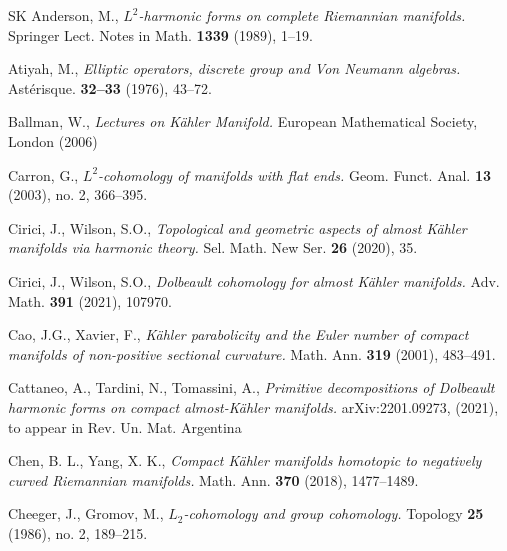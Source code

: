 \documentclass[12pt, twoside]{article}
\theoremstyle{definition}
\numberwithin{equation}{section}
\begin{document}
	\bigskip
	\footnotesize
	\begin{thebibliography}{SK}
		Anderson, M.,
		\textit{$L^{2}$-harmonic forms on complete Riemannian manifolds.}
		Springer Lect. Notes in Math. \textbf{1339} (1989), 1--19.
		
		Atiyah, M.,
		\textit{Elliptic operators, discrete group and Von Neumann algebras.}
		Ast\'{e}risque. \textbf{32--33} (1976), 43--72. 
		
		Ballman, W.,
		\textit{Lectures on K\"{a}hler Manifold.}
		European Mathematical Society, London (2006)
		
		
		
		
		Carron, G.,
		\textit{$L^{2}$-cohomology of manifolds with flat ends.}
		Geom. Funct. Anal. \textbf{13} (2003), no. 2, 366--395.
		
		
		Cirici, J., Wilson, S.O.,
		\textit{Topological and geometric aspects of almost K\"{a}hler manifolds via harmonic theory.}
		Sel. Math. New Ser. \textbf{26} (2020), 35.
		
		Cirici, J., Wilson, S.O.,
		\textit{Dolbeault cohomology for almost K\"{a}hler manifolds.}
		Adv. Math. \textbf{391} (2021), 107970.
		
		Cao, J.G., Xavier, F.,
		\textit{K\"{a}hler parabolicity and the Euler number of compact manifolds of non-positive sectional curvature.}
		Math. Ann. \textbf{319} (2001), 483--491.
		
		Cattaneo, A., Tardini, N., Tomassini, A.,
		\textit{Primitive decompositions of Dolbeault harmonic forms on compact almost-K\"{a}hler manifolds.}
		arXiv:2201.09273, (2021), to appear in Rev. Un. Mat. Argentina
		
		Chen, B. L., Yang, X. K.,
		\textit{Compact K\"{a}hler manifolds homotopic to negatively curved Riemannian manifolds.}
		Math. Ann. \textbf{370} (2018), 1477--1489.
			
		Cheeger, J., Gromov, M.,
		\textit{$L_{2}$-cohomology and group cohomology.}
		Topology \textbf{25} (1986), no. 2, 189--215.	
			

\end{thebibliography}
\end{document}
